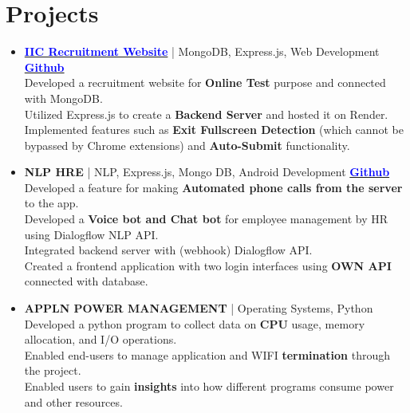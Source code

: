 \documentclass[a4paper,11pt]{article}
\begin{document}
\section*{Projects}
\vspace{-4pt}
\begin{itemize}
 \item \textbf{\href{https://iicnow.netlify.app/}{\textcolor{blue}{IIC Recruitment Website}}} | MongoDB, Express.js, Web Development \hspace{40mm}\textbf{\href{https://github.com/bkkurandwad/iicbackend.git}{\textcolor{blue}{Github}} }\\
    Developed a recruitment website for \textbf{Online Test} purpose and connected with MongoDB. \\
    Utilized Express.js to create a \textbf{Backend Server} and hosted it on Render. \\
    Implemented features such as \textbf{Exit Fullscreen Detection} (which cannot be bypassed by Chrome extensions) and \textbf{Auto-Submit} functionality.
\vspace{+2pt}
\item \textbf{NLP HRE} | NLP, Express.js, Mongo DB, Android Development \hspace{50mm} \textbf{\href{https://github.com/bkkurandwad/NLPHRE}{\textcolor{blue}{Github}}} \\
    Developed a feature for making \textbf{Automated phone calls from the server} to the app. \\
    Developed a \textbf{Voice bot and Chat bot} for employee management by HR using Dialogflow NLP API. \\
    Integrated backend server with (webhook) Dialogflow API. \\
    Created a frontend application with two login interfaces using \textbf{OWN API} connected with database.
\vspace{+4pt}
    \item \textbf{APPLN POWER MANAGEMENT} | Operating Systems, Python\\
    Developed a python program to collect data on \textbf{CPU} usage, memory allocation, and I/O operations. \\
    Enabled end-users to manage application and WIFI \textbf{termination} through the project. \\
    Enabled users to gain \textbf{insights} into how different programs consume power and other resources.

\end{itemize}
\end{document}
